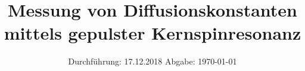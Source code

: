 

\subject{VERSUCH NUMMER 49}
\title{Messung von Diffusionskonstanten mittels gepulster Kernspinresonanz}
\date{
  Durchführung: 17.12.2018
  \hspace{3em}
  Abgabe: \today
}



\thispagestyle{empty}
\maketitle
\thispagestyle{empty}
\tableofcontents
\newpage
\setcounter{page}{1}


% 




\nocite{*}
\printbibliography


